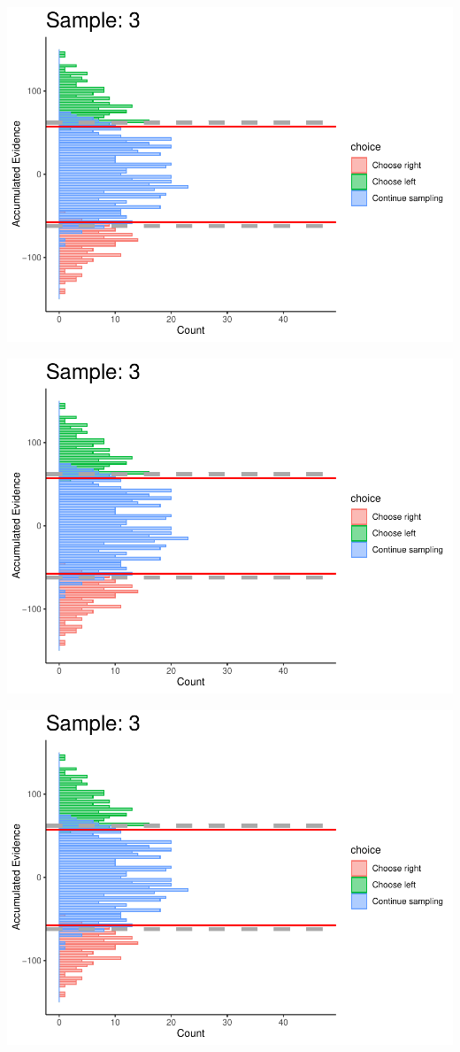 \documentclass[
]{book}
\begin{document}
\begin{center}\includegraphics[width=0.8\linewidth]{LateNightBayes_files/figure-latex/collapsing_dcb-23} \end{center}

\begin{center}\includegraphics[width=0.8\linewidth]{LateNightBayes_files/figure-latex/collapsing_dcb-24} \end{center}

\begin{center}\includegraphics[width=0.8\linewidth]{LateNightBayes_files/figure-latex/collapsing_dcb-25} \end{center}
\end{document}
